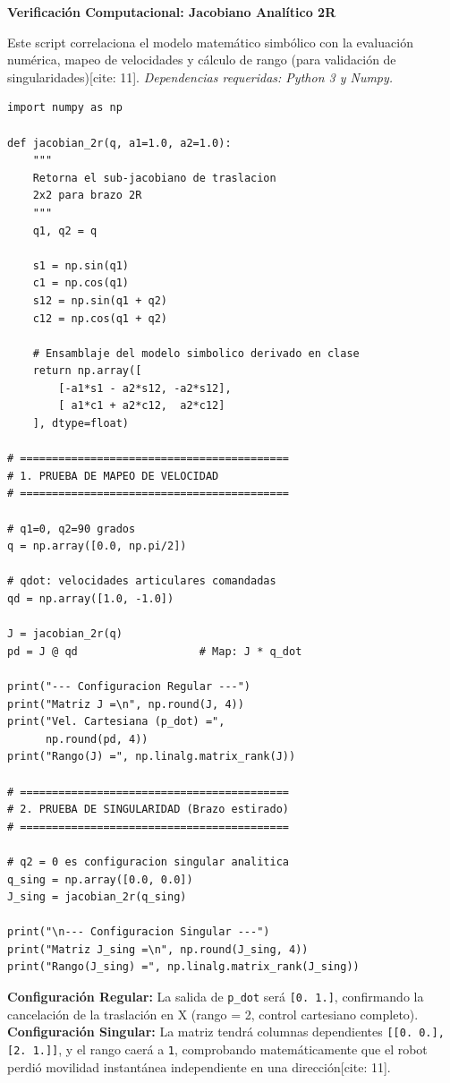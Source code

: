 \documentclass[11pt, a4paper]{article}
\begin{document}
\begin{center}
    \Large\textbf{\textcolor{ucbblue}{Verificación Computacional: Jacobiano Analítico 2R}}\\[0.2cm]
\end{center}

Este script correlaciona el modelo matemático simbólico con la evaluación numérica, mapeo de velocidades y cálculo de rango (para validación de singularidades)[cite: 11]. 
\textit{Dependencias requeridas: Python 3 y Numpy.}

\begin{lstlisting}
import numpy as np

def jacobian_2r(q, a1=1.0, a2=1.0):
    """ 
    Retorna el sub-jacobiano de traslacion 
    2x2 para brazo 2R 
    """
    q1, q2 = q
    
    s1 = np.sin(q1)
    c1 = np.cos(q1)
    s12 = np.sin(q1 + q2)
    c12 = np.cos(q1 + q2)
    
    # Ensamblaje del modelo simbolico derivado en clase
    return np.array([
        [-a1*s1 - a2*s12, -a2*s12],
        [ a1*c1 + a2*c12,  a2*c12]
    ], dtype=float)

# ==========================================
# 1. PRUEBA DE MAPEO DE VELOCIDAD
# ==========================================

# q1=0, q2=90 grados
q = np.array([0.0, np.pi/2])  

# qdot: velocidades articulares comandadas
qd = np.array([1.0, -1.0])    

J = jacobian_2r(q)
pd = J @ qd                   # Map: J * q_dot

print("--- Configuracion Regular ---")
print("Matriz J =\n", np.round(J, 4))
print("Vel. Cartesiana (p_dot) =", 
      np.round(pd, 4))
print("Rango(J) =", np.linalg.matrix_rank(J))

# ==========================================
# 2. PRUEBA DE SINGULARIDAD (Brazo estirado)
# ==========================================

# q2 = 0 es configuracion singular analitica
q_sing = np.array([0.0, 0.0]) 
J_sing = jacobian_2r(q_sing)

print("\n--- Configuracion Singular ---")
print("Matriz J_sing =\n", np.round(J_sing, 4))
print("Rango(J_sing) =", np.linalg.matrix_rank(J_sing))
\end{lstlisting}

\begin{tcolorbox}[colback=white, colframe=ucbblue, title=\textbf{Salida Esperada y Correspondencia}]
\textbf{Configuración Regular:} La salida de \texttt{p\_dot} será \texttt{[0. 1.]}, confirmando la cancelación de la traslación en X (rango = 2, control cartesiano completo). \\
\textbf{Configuración Singular:} La matriz tendrá columnas dependientes \texttt{[[0. 0.], [2. 1.]]}, y el rango caerá a \texttt{1}, comprobando matemáticamente que el robot perdió movilidad instantánea independiente en una dirección[cite: 11].
\end{tcolorbox}
\end{document}
